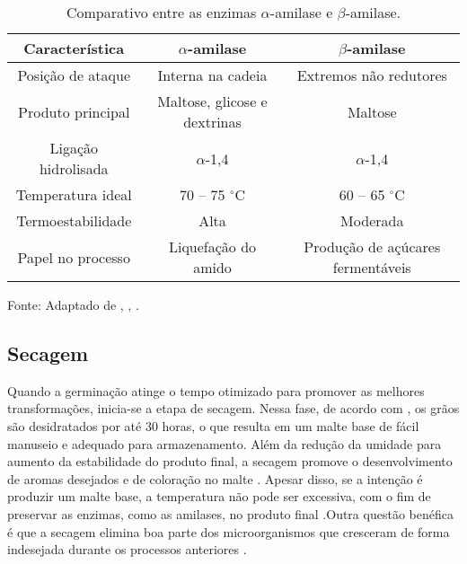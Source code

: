 \begin{table}[ht]
    \caption{Comparativo entre as enzimas $\alpha$-amilase e $\beta$-amilase.}
    \label{tab:amilases}
    \centering
    \begin{tabular}{ccc}
        \hline
        \bfseries Característica & \bfseries $\alpha$-amilase & \bfseries $\beta$-amilase \\
        \hline
        Posição de ataque & Interna na cadeia & Extremos não redutores \\
        Produto principal & Maltose, glicose e dextrinas & Maltose \\
        Ligação hidrolisada & $\alpha$-1,4 & $\alpha$-1,4 \\
        Temperatura ideal & 70 -- 75 $^{\circ}$C & 60 -- 65 $^{\circ}$C \\
        Termoestabilidade & Alta & Moderada \\
        Papel no processo & Liquefação do amido & Produção de açúcares fermentáveis \\
        \hline
    \end{tabular}

    {\centering\footnotesize Fonte: Adaptado de , , .\par}
\end{table}



\subsection{Secagem}

Quando a germinação atinge o tempo otimizado para promover as melhores transformações, inicia-se a etapa de secagem. Nessa fase, de acordo com , os grãos são desidratados por até 30 horas, o que resulta em um malte base de fácil manuseio e adequado para armazenamento. Além da redução da umidade para aumento da estabilidade do produto final, a secagem promove o desenvolvimento de aromas desejados e de coloração no malte \cite{BAMFORTH2003}. Apesar disso, se a intenção é produzir um malte base, a temperatura não pode ser excessiva, com o fim de preservar as enzimas, como as amilases, no produto final \cite{LEWIS2012}.Outra questão benéfica é que a secagem elimina boa parte dos microorganismos que cresceram de forma indesejada durante os processos anteriores \cite{DOUGLAS1988, PETTERS1988}. 



